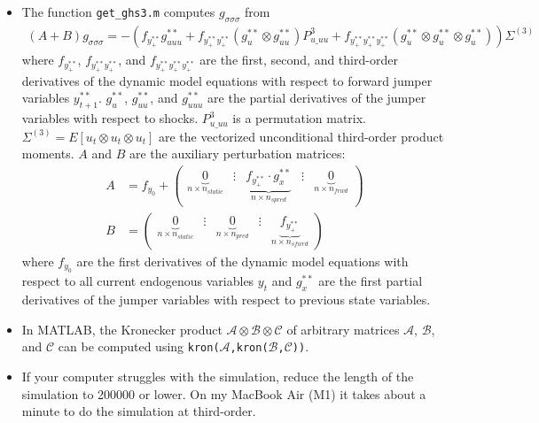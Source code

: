 \documentclass{article}
\begin{document}
\begin{itemize}
\item
The function \texttt{get\_ghs3.m} computes \(g_{\sigma\sigma\sigma}\) from
\begin{align*}
(A+B) g_{\sigma\sigma\sigma} = -\left( f_{y^{**}_{+}} g^{**}_{uuu} + f_{y^{**}_{+}y^{**}_{+}} (g^{**}_u \otimes g^{**}_{uu})P^3_{u\_uu} + f_{y^{**}_{+}y^{**}_{+}y^{**}_{+}} (g^{**}_u \otimes g^{**}_u \otimes g^{**}_u)\right)\Sigma^{(3)} \label{eq:gsss}
\end{align*}
where \(f_{y^{**}_{+}}\), \(f_{y^{**}_{+}y^{**}_{+}}\), and \(f_{y^{**}_{+}y^{**}_{+}y^{**}_{+}}\) are the first, second, and third-order derivatives of the dynamic model equations with respect to forward jumper variables \(y_{t+1}^{**}\).
\(g^{**}_u\), \(g^{**}_{uu}\), and \(g^{**}_{uuu}\) are the partial derivatives of the jumper variables with respect to shocks.
\(P^3_{u\_uu}\) is a permutation matrix.
\(\Sigma^{(3)} = E[u_t \otimes u_t \otimes u_t]\) are the vectorized unconditional third-order product moments.
\(A\) and \(B\) are the auxiliary perturbation matrices:
\begin{align*}
A & = f_{y_0} + \begin{pmatrix} \underbrace{0}_{n\times n_{static}} &\vdots& \underbrace{f_{y^{**}_{+}} \cdot g^{**}_{x}}_{n \times n_{spred}} &\vdots& \underbrace{0}_{n\times n_{frwd}}  \end{pmatrix}\\
B & = \begin{pmatrix} \underbrace{0}_{n \times n_{static}}&\vdots & \underbrace{0}_{n \times n_{pred}} & \vdots & \underbrace{f_{y^{**}_{+}}}_{n \times n_{sfwrd}} \end{pmatrix}
\end{align*}
where \(f_{y_{0}}\) are the first derivatives of the dynamic model equations with respect to all current endogenous variables \(y_{t}^{}\)
and \(g^{**}_{x}\) are the first partial derivatives of the jumper variables with respect to previous state variables.

\item
In MATLAB, the Kronecker product \(\mathcal{A} \otimes \mathcal{B} \otimes \mathcal{C}\) of arbitrary matrices \(\mathcal{A}\), \(\mathcal{B}\), and \(\mathcal{C}\)
  can be computed using \texttt{kron{(\(\mathcal{A}\),kron{(\(\mathcal{B}\),\(\mathcal{C}\))})}}.

\item
If your computer struggles with the simulation, reduce the length of the simulation to 200000 or lower.
On my MacBook Air (M1) it takes about a minute to do the simulation at third-order.
\end{itemize}
\end{document}
